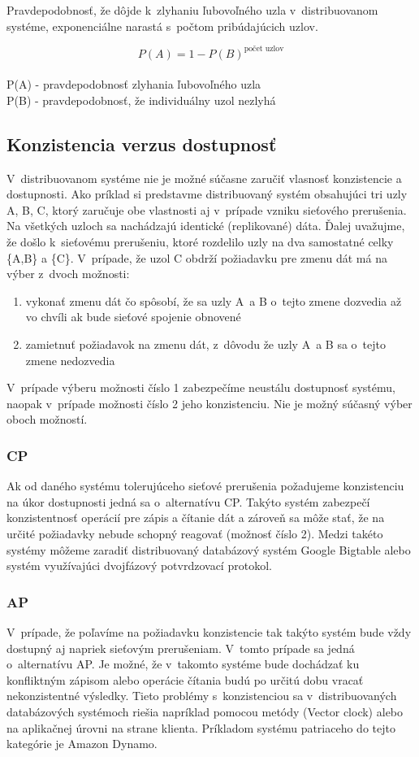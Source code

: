 \documentclass[11pt,twoside,a4paper]{book}
\begin{document}
\noindent
Pravdepodobnosť, že dôjde k~zlyhaniu ľubovoľného uzla v~distribuovanom systéme, exponenciálne narastá s~počtom pribúdajúcich uzlov.

$$P(A) = 1 - P(B)^{\textrm{počet uzlov}}$$
\\
P(A) - pravdepodobnosť zlyhania ľubovoľného uzla \\
P(B) - pravdepodobnosť, že individuálny uzol nezlyhá

\subsection{Konzistencia verzus dostupnosť}

V~distribuovanom systéme nie je možné súčasne zaručiť vlasnosť konzistencie a dostupnosti. Ako príklad si predstavme distribuovaný systém obsahujúci tri uzly A, B, C, ktorý zaručuje obe vlastnosti aj v~prípade vzniku sieťového prerušenia. Na všetkých uzloch sa nachádzajú identické (replikované) dáta. Ďalej uvažujme, že došlo k~sieťovému prerušeniu, ktoré rozdelilo uzly na dva samostatné celky \{A,B\} a \{C\}. V~prípade, že uzol C obdrží požiadavku pre zmenu dát má na výber z~dvoch možnosti:
\begin{enumerate}
 \item vykonať zmenu dát čo spôsobí, že sa uzly A~a B o~tejto zmene dozvedia až vo chvíli ak bude sieťové spojenie obnovené
 \item zamietnuť požiadavok na zmenu dát, z~dôvodu že uzly A~a B sa o~tejto zmene nedozvedia
\end{enumerate}

V~prípade výberu možnosti číslo 1 zabezpečíme neustálu dostupnosť systému, naopak v~prípade možnosti číslo 2 jeho konzistenciu. Nie je možný súčasný výber oboch možností.

\subsubsection*{CP}
Ak od daného systému tolerujúceho sieťové prerušenia požadujeme konzistenciu na úkor dostupnosti jedná sa o~alternatívu CP. Takýto systém zabezpečí konzistentnosť operácií pre zápis a čítanie dát a zároveň sa môže stať, že na určité požiadavky nebude schopný reagovať (možnosť číslo 2). Medzi takéto systémy môžeme zaradiť distribuovaný databázový systém Google Bigtable alebo systém využívajúci dvojfázový potvrdzovací protokol.

\subsubsection*{AP}
V~prípade, že poľavíme na požiadavku konzistencie tak takýto systém bude vždy dostupný aj napriek sieťovým prerušeniam. V~tomto prípade sa jedná o~alternatívu AP. Je možné, že v~takomto systéme bude dochádzať ku konfliktným zápisom alebo operácie čítania budú po určitú dobu vracať nekonzistentné výsledky. Tieto problémy s~konzistenciou sa v~distribuovaných databázových systémoch riešia napríklad pomocou metódy  (Vector clock) \cite{decandia2007dynamo} alebo na aplikačnej úrovni na strane klienta. Príkladom systému patriaceho do tejto kategórie je Amazon Dynamo.
\end{document}
